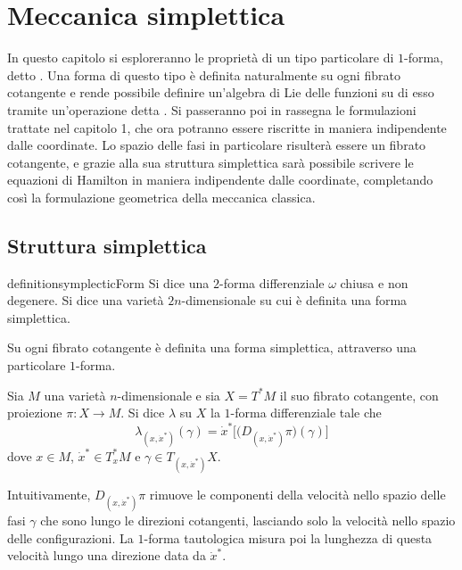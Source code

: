 \chapter{Meccanica simplettica}
In questo capitolo si esploreranno le proprietà di un tipo particolare di $1$-forma, detto . Una forma di questo tipo è definita naturalmente su ogni fibrato cotangente e rende possibile definire un'algebra di Lie delle funzioni su di esso tramite un'operazione detta . Si passeranno poi in rassegna le formulazioni trattate nel capitolo 1, che ora potranno essere riscritte in maniera indipendente dalle coordinate. Lo spazio delle fasi in particolare risulterà essere un fibrato cotangente, e grazie alla sua struttura simplettica sarà possibile scrivere le equazioni di Hamilton in maniera indipendente dalle coordinate, completando così la formulazione geometrica della meccanica classica.

\section{Struttura simplettica}

\begin{restatable}{definition}{symplecticForm}
  Si dice  una $2$-forma differenziale $\omega$ chiusa e non degenere. Si dice  una varietà $2n$-dimensionale su cui è definita una forma simplettica.
\end{restatable} %

Su ogni fibrato cotangente è definita una forma simplettica, attraverso una particolare $1$-forma.
\begin{definition}
  Sia $M$ una varietà $n$-dimensionale e sia $X = T^*M$ il suo fibrato cotangente, con proiezione $\pi:X\to M$. Si dice  $\lambda$ su $X$ la $1$-forma differenziale tale che \begin{equation*}
  \lambda_{(x, \dot{x}^*)}(\gamma) = \dot{x}^* \bigg[\big(D_{(x, \dot{x}^*)} \pi\big)(\gamma)\bigg]
  \end{equation*} 
  dove $x \in M$, $\dot{x}^* \in T_x^* M$ e $\gamma \in T_{(x,\dot{x}^*)}X$.
\end{definition}
\begin{remark}
  Intuitivamente, $D_{(x,\dot{x}^*)} \pi$ rimuove le componenti della velocità nello spazio delle fasi $\gamma$ che sono lungo le direzioni cotangenti, lasciando solo la velocità nello spazio delle configurazioni. La $1$-forma tautologica misura poi la lunghezza di questa velocità lungo una direzione data da $\dot{x}^*$. 
\end{remark}

